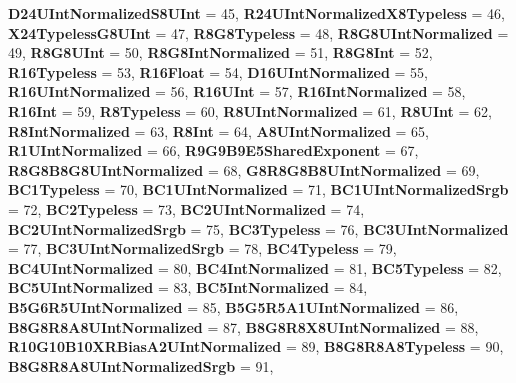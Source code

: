 \begin{DoxyCompactItemize}
{\bfseries D24\+U\+Int\+Normalized\+S8\+U\+Int} = 45, 
{\bfseries R24\+U\+Int\+Normalized\+X8\+Typeless} = 46, 
\newline
{\bfseries X24\+Typeless\+G8\+U\+Int} = 47, 
{\bfseries R8\+G8\+Typeless} = 48, 
{\bfseries R8\+G8\+U\+Int\+Normalized} = 49, 
{\bfseries R8\+G8\+U\+Int} = 50, 
\newline
{\bfseries R8\+G8\+Int\+Normalized} = 51, 
{\bfseries R8\+G8\+Int} = 52, 
{\bfseries R16\+Typeless} = 53, 
{\bfseries R16\+Float} = 54, 
\newline
{\bfseries D16\+U\+Int\+Normalized} = 55, 
{\bfseries R16\+U\+Int\+Normalized} = 56, 
{\bfseries R16\+U\+Int} = 57, 
{\bfseries R16\+Int\+Normalized} = 58, 
\newline
{\bfseries R16\+Int} = 59, 
{\bfseries R8\+Typeless} = 60, 
{\bfseries R8\+U\+Int\+Normalized} = 61, 
{\bfseries R8\+U\+Int} = 62, 
\newline
{\bfseries R8\+Int\+Normalized} = 63, 
{\bfseries R8\+Int} = 64, 
{\bfseries A8\+U\+Int\+Normalized} = 65, 
{\bfseries R1\+U\+Int\+Normalized} = 66, 
\newline
{\bfseries R9\+G9\+B9\+E5\+Shared\+Exponent} = 67, 
{\bfseries R8\+G8\+B8\+G8\+U\+Int\+Normalized} = 68, 
{\bfseries G8\+R8\+G8\+B8\+U\+Int\+Normalized} = 69, 
{\bfseries B\+C1\+Typeless} = 70, 
\newline
{\bfseries B\+C1\+U\+Int\+Normalized} = 71, 
{\bfseries B\+C1\+U\+Int\+Normalized\+Srgb} = 72, 
{\bfseries B\+C2\+Typeless} = 73, 
{\bfseries B\+C2\+U\+Int\+Normalized} = 74, 
\newline
{\bfseries B\+C2\+U\+Int\+Normalized\+Srgb} = 75, 
{\bfseries B\+C3\+Typeless} = 76, 
{\bfseries B\+C3\+U\+Int\+Normalized} = 77, 
{\bfseries B\+C3\+U\+Int\+Normalized\+Srgb} = 78, 
\newline
{\bfseries B\+C4\+Typeless} = 79, 
{\bfseries B\+C4\+U\+Int\+Normalized} = 80, 
{\bfseries B\+C4\+Int\+Normalized} = 81, 
{\bfseries B\+C5\+Typeless} = 82, 
\newline
{\bfseries B\+C5\+U\+Int\+Normalized} = 83, 
{\bfseries B\+C5\+Int\+Normalized} = 84, 
{\bfseries B5\+G6\+R5\+U\+Int\+Normalized} = 85, 
{\bfseries B5\+G5\+R5\+A1\+U\+Int\+Normalized} = 86, 
\newline
{\bfseries B8\+G8\+R8\+A8\+U\+Int\+Normalized} = 87, 
{\bfseries B8\+G8\+R8\+X8\+U\+Int\+Normalized} = 88, 
{\bfseries R10\+G10\+B10\+X\+R\+Bias\+A2\+U\+Int\+Normalized} = 89, 
{\bfseries B8\+G8\+R8\+A8\+Typeless} = 90, 
\newline
{\bfseries B8\+G8\+R8\+A8\+U\+Int\+Normalized\+Srgb} = 91, 

\end{DoxyCompactItemize}
